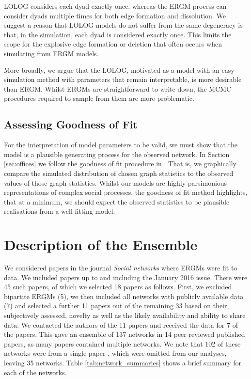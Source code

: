 \documentclass[
]{statsoc}
\begin{document}
LOLOG considers each dyad exactly once, whereas the ERGM process can
consider dyads multiple times for both edge formation and dissolution.
We suggest a reason that LOLOG models do not suffer from the same
degeneracy is that, in the simulation, each dyad is considered exactly
once. This limits the scope for the explosive edge formation or deletion
that often occurs when simulating from ERGM models.

More broadly, we argue that the LOLOG, motivated as a model with an easy
simulation method with parameters that remain interpretable, is more
desirable than ERGM. Whilst ERGMs are straightforward to write down, the
MCMC procedures required to sample from them are more problematic.

\subsection{Assessing Goodness of Fit}

For the interpretation of model parameters to be valid, we must show
that the model is a plausible generating process for the observed
network. In Section \ref{sec:offices} we follow the goodness of fit
procedure in \cite{Hunter_Goodreau_2008}. That is, we graphically
compare the simulated distribution of chosen graph statistics to the
observed values of those graph statistics. Whilst our models are highly
parsimonious representations of complex social processes, the goodness
of fit method highlights, that at a minimum, we should expect the
observed statistics to be plausible realisations from a well-fitting
model.

\section{Description of the Ensemble}\label{sec:description}

We considered papers in the journal \emph{Social networks} where ERGMs
were fit to data. We included papers up to and including the January
2016 issue. There were 45 such papers, of which we selected 18 papers as
follows. First, we excluded bipartite ERGMs (5), we then included all
networks with publicly available data (7) and selected a further 11
papers out of the remaining 33 based on their, subjectively assessed,
novelty as well as the likely availability and ability to share data. We
contacted the authors of the 11 papers and received the data for 7 of
the papers. This gave an ensemble of 137 networks in 14 peer reviewed
published papers, as many papers contained multiple networks. We note
that 102 of these networks were from a single paper \citep{Lubbers2007},
which were omitted from our analyses, leaving 35 networks. Table
\ref{tab:network_summaries} shows a brief summary for each of the
networks.
\end{document}
